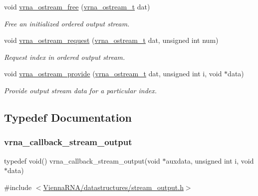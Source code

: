 \begin{DoxyCompactItemize}
void \mbox{\hyperlink{group__buffer__utils_gaf813ec90e1446ba82c89f9a39688a3b3}{vrna\+\_\+ostream\+\_\+free}} (\mbox{\hyperlink{group__buffer__utils_ga8da189552af21ab6e4e88bdcc240870c}{vrna\+\_\+ostream\+\_\+t}} dat)
\begin{DoxyCompactList}\small\item\em Free an initialized ordered output stream. \end{DoxyCompactList}\item 
void \mbox{\hyperlink{group__buffer__utils_gaebca91932705d71bcbf00bd8d82bd7c8}{vrna\+\_\+ostream\+\_\+request}} (\mbox{\hyperlink{group__buffer__utils_ga8da189552af21ab6e4e88bdcc240870c}{vrna\+\_\+ostream\+\_\+t}} dat, unsigned int num)
\begin{DoxyCompactList}\small\item\em Request index in ordered output stream. \end{DoxyCompactList}\item 
void \mbox{\hyperlink{group__buffer__utils_ga6253c42abdeaf3b41a38204865e1f0f7}{vrna\+\_\+ostream\+\_\+provide}} (\mbox{\hyperlink{group__buffer__utils_ga8da189552af21ab6e4e88bdcc240870c}{vrna\+\_\+ostream\+\_\+t}} dat, unsigned int i, void $\ast$data)
\begin{DoxyCompactList}\small\item\em Provide output stream data for a particular index. \end{DoxyCompactList}\end{DoxyCompactItemize}


\subsection{Typedef Documentation}
\mbox{\label{group__buffer__utils_ga4adb94338a6f0a1a451e03c1bdac0d9d}} 
\subsubsection{\texorpdfstring{vrna\_callback\_stream\_output}{vrna\_callback\_stream\_output}}
{\footnotesize\ttfamily typedef void() vrna\+\_\+callback\+\_\+stream\+\_\+output(void $\ast$auxdata, unsigned int i, void $\ast$data)}



{\ttfamily \#include $<$\mbox{\hyperlink{datastructures_2stream__output_8h}{Vienna\+R\+N\+A/datastructures/stream\+\_\+output.\+h}}$>$}



